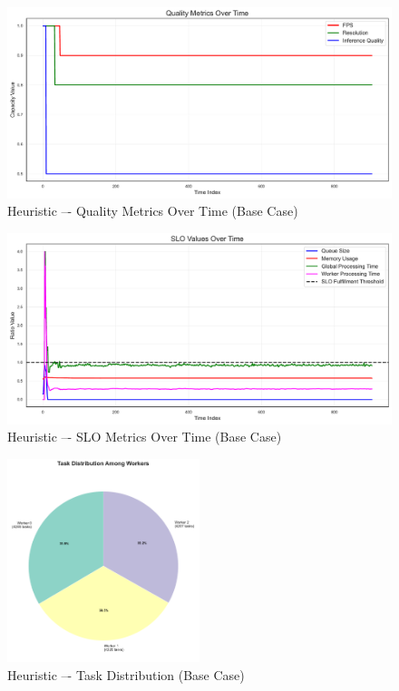 \begin{figure}[h]
    \centering
    \includegraphics[width=\textwidth]{img/results/basic/heuristic_quality_metrics.pdf}
    \caption{Heuristic –- Quality Metrics Over Time (Base Case)}
\end{figure}
\begin{figure}[h]
    \centering
    \includegraphics[width=\textwidth]{img/results/basic/heuristic_slo_values.pdf}
    \caption{Heuristic –- SLO Metrics Over Time (Base Case)}
\end{figure}
\begin{figure}[h]
    \centering
    \includegraphics[width=0.5\textwidth]{img/results/basic/heuristic_task_distribution_pie.pdf}
    \caption{Heuristic –- Task Distribution (Base Case)}
\end{figure}

